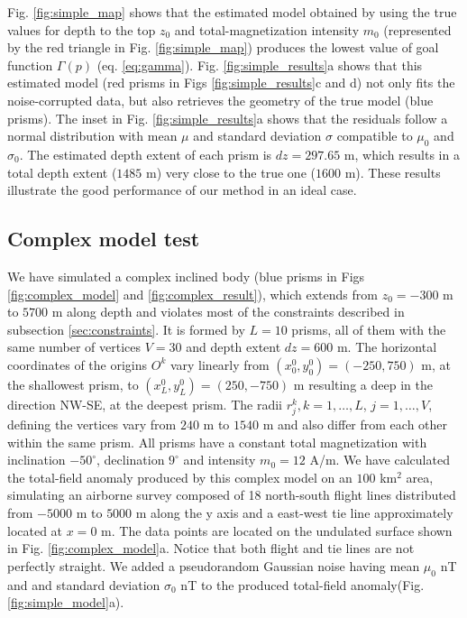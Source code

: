 Fig. \ref{fig:simple_map} shows that the estimated model obtained by using the true values for depth to the top $ z_0 $ and total-magnetization intensity $ m_0 $ (represented by the red triangle in Fig. \ref{fig:simple_map}) produces the lowest value of goal function  $ \Gamma(p) $ (eq. \ref{eq:gamma}). Fig. \ref{fig:simple_results}a shows that this estimated model (red prisms in Figs \ref{fig:simple_results}c and d) not only fits the noise-corrupted data, but also retrieves the geometry of the true model (blue prisms). The inset in Fig. \ref{fig:simple_results}a shows that the residuals follow a normal distribution with mean $ \mu $ and standard deviation $ \sigma $ compatible to $ \mu_0 $ and $ \sigma_0 $. The estimated depth extent of each prism is $ dz = 297.65 $ m, which results in a total depth extent ($ 1485$ m) very close to the true one ($ 1600 $ m). These results illustrate the good performance of our method in an ideal case.

\subsection{Complex model test}

We have simulated a complex inclined body (blue prisms in Figs \ref{fig:complex_model} and \ref{fig:complex_result}), which extends from $z_0=-300$ m to $5700$ m along depth and violates most of the constraints described in subsection \ref{sec:constraints}. It is formed by $ L = 10 $ prisms, all of them with the same number of vertices $ V = 30 $ and depth extent $ dz = 600 $ m. The horizontal coordinates of the origins $ O^k $ vary linearly from $ (x_0^0, y_0^0) = (-250, 750) $ m, at the shallowest prism, to $ (x_L^0, y_L^0) = (250, -750) $ m resulting a deep in the direction NW-SE, at the deepest prism. The radii $ r^k_j, k = 1, \dots, L$, $j = 1,\dots, V$, defining the vertices vary from $ 240 $ m to $ 1540 $ m and also differ from each other within the same prism. All prisms have a constant total magnetization with inclination $ -50^\circ $, declination $ 9^\circ $ and intensity $ m_0 = 12 $ A/m. We have calculated the total-field anomaly produced by this complex model on an $ 100 $ km$^2 $ area, simulating an airborne survey composed of 18 north-south flight lines distributed from $ -5000 $ m to $ 5000 $ m along the y axis and a east-west tie line approximately located at $ x = 0 $ m. The data points are located on the undulated surface shown in Fig. \ref{fig:complex_model}a. Notice that both flight and tie lines are not perfectly straight. We added a pseudorandom Gaussian noise having mean $ \mu_0$ nT and and standard deviation $ \sigma_0$ nT to the produced total-field anomaly(Fig. \ref{fig:simple_model}a).

